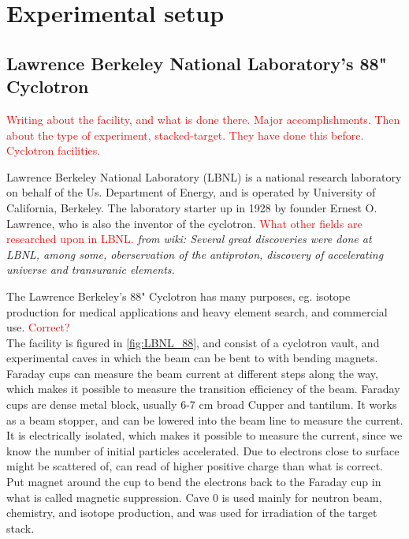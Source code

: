 \documentclass[a4paper,11pt,twoside]{book}
\begin{document}
\chapter{Experimental setup} \label{Experiment}




\section{Lawrence Berkeley National Laboratory's 88" Cyclotron} \label{sec:Cyclotron}
\noindent

\textcolor{red}{Writing about the facility, and what is done there. Major accomplishments. Then about the type of experiment, stacked-target. They have done this before. Cyclotron facilities. }

Lawrence Berkeley National Laboratory (LBNL) is a national research laboratory on behalf of the Us. Department of Energy, and is operated by University of California, Berkeley. The laboratory starter up in 1928 by founder Ernest O. Lawrence, who is also the inventor of the cyclotron. \textcolor{red}{What other fields are researched upon in LBNL.} \textit{from wiki: Several great discoveries were done at LBNL, among some, oberservation of the antiproton, discovery of accelerating universe and transuranic elements. }

\noindent
The Lawrence Berkeley's 88" Cyclotron has many purposes, eg. isotope production for medical applications and heavy element search, and commercial use.  \textcolor{red}{Correct?} \\

\noindent
The  facility is figured in \ref{fig:LBNL_88}, and consist of a cyclotron vault, and experimental caves in which the beam can be bent to with bending magnets. Faraday cups can measure the beam current at different steps along the way, which makes it possible to measure the transition efficiency of the beam. Faraday cups are dense metal block, usually 6-7 cm broad Cupper and tantilum. It works as a beam stopper, and can be lowered into the beam line to measure the current. It is electrically isolated, which makes it possible to measure the current, since we know the number of initial particles accelerated. Due to electrons close to surface might be scattered of, can read of higher positive charge than what is correct. Put magnet around the cup to bend the electrons back to the Faraday cup in what is called magnetic suppression.
\noindent
Cave 0 is used mainly for neutron beam, chemistry, and isotope production, and was used for irradiation of the target stack. 
\end{document}
